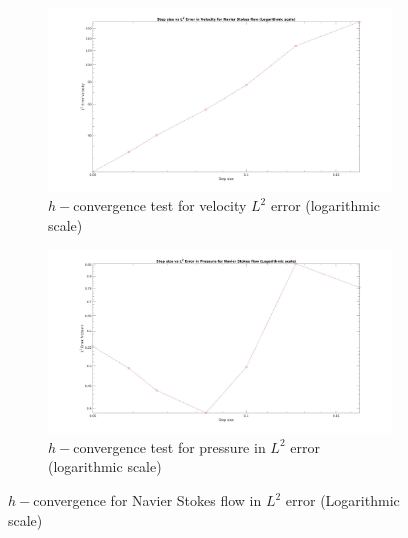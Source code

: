 \documentclass[a4paper,openany]{book}
\begin{document}
\begin{figure}
\begin{subfigure}{\textwidth}	
  \includegraphics[width=\linewidth]{L2_convergence_velocity_n_s_log.jpg}
  \caption{$h-$convergence test for velocity $L^2$ error (logarithmic scale)}
  \label{fig:vel_naviers_stoke_conv_log}
\end{subfigure}
\begin{subfigure}{\textwidth}	
  \includegraphics[width=\linewidth]{L2_convergence_pressure_n_s_log.jpg}
  \caption{$h-$convergence test for pressure in $L^2$ error (logarithmic scale)}
  \label{fig:pre_navier_stoke_conv_log}
\end{subfigure}
\caption{$h-$convergence for Navier Stokes flow in $L^2$ error (Logarithmic scale)}
\label{navier_stoke_conv_l2_log}
\end{figure}
\end{document}
